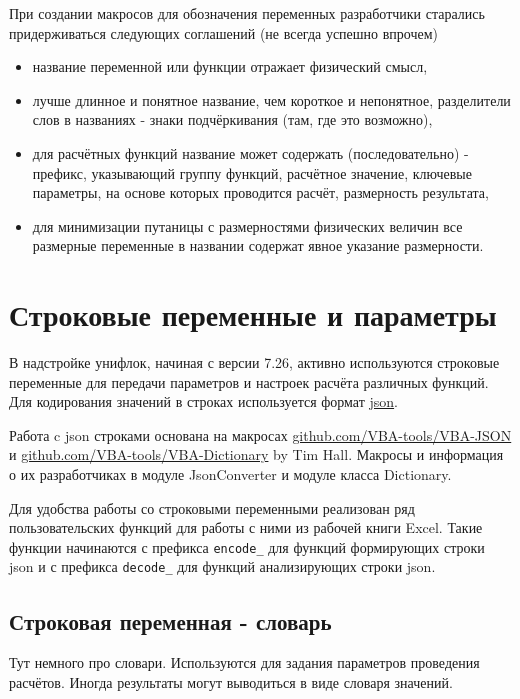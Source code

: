 При создании макросов для обозначения переменных разработчики старались придерживаться следующих соглашений (не всегда успешно впрочем)
\begin{itemize}
	\item название переменной или функции отражает физический смысл,
	\item лучше длинное и понятное название, чем короткое и непонятное, разделители слов в названиях - знаки подчёркивания (там, где это возможно),
	\item для расчётных функций название может содержать (последовательно) - префикс, указывающий группу функций, расчётное значение, ключевые параметры, на основе которых проводится расчёт, размерность результата,
	\item для минимизации путаницы с размерностями физических величин все размерные переменные в названии содержат явное указание размерности.
\end{itemize}

\section{Строковые переменные и параметры}
В надстройке унифлок, начиная с версии 7.26, активно используются строковые переменные для передачи параметров и настроек расчёта различных функций. Для кодирования значений в строках используется формат  \href{https://ru.wikipedia.org/wiki/JSON}{json}. 

Работа c json строками основана на макросах \href{https://github.com/VBA-tools/VBA-JSON}{github.com/VBA-tools/VBA-JSON} и \href{https://github.com/VBA-tools/VBA-Dictionary}{github.com/VBA-tools/VBA-Dictionary} by Tim Hall. Макросы и информация о их разработчиках в модуле JsonConverter и модуле класса Dictionary.

Для удобства работы со строковыми переменными реализован ряд пользовательских функций для работы с ними из рабочей книги Excel. Такие функции начинаются с префикса \texttt{encode_} для функций формирующих строки json и с префикса \texttt{decode_} для функций анализирующих строки json.

\subsection{Строковая переменная - словарь}
Тут немного про словари. Используются для задания параметров проведения расчётов. Иногда результаты могут выводиться в виде словаря значений.

